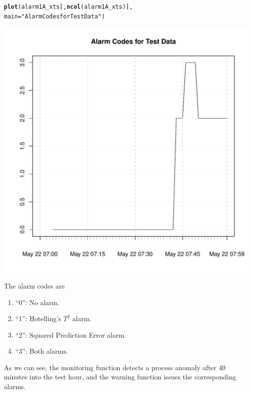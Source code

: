 \documentclass{report}\usepackage[]{graphicx}\usepackage[]{color}
\makeatletter
\def\maxwidth{ %
  \ifdim\Gin@nat@width>\linewidth
    \linewidth
  \else
    \Gin@nat@width
  \fi
}
\newcommand{\hlstr}[1]{\textcolor[rgb]{0.192,0.494,0.8}{#1}}%
\newcommand{\hlstd}[1]{\textcolor[rgb]{0.345,0.345,0.345}{#1}}%
\newcommand{\hlkwc}[1]{\textcolor[rgb]{0.333,0.667,0.333}{#1}}%
\newcommand{\hlkwd}[1]{\textcolor[rgb]{0.737,0.353,0.396}{\textbf{#1}}}%
\newenvironment{kframe}{%
 \def\at@end@of@kframe{}%
 \ifinner\ifhmode%
  \def\at@end@of@kframe{\end{minipage}}%
  \begin{minipage}{\columnwidth}%
 \fi\fi%
 \def\FrameCommand##1{\hskip\@totalleftmargin \hskip-\fboxsep
 \colorbox{shadecolor}{##1}\hskip-\fboxsep
     \hskip-\linewidth \hskip-\@totalleftmargin \hskip\columnwidth}%
 \MakeFramed {\advance\hsize-\width
   \@totalleftmargin\z@ \linewidth\hsize
   \@setminipage}}%
 {\par\unskip\endMakeFramed%
 \at@end@of@kframe}
\newenvironment{knitrout}{}{} %
\makeatother
\begin{document}
\begin{knitrout}
\color{fgcolor}\begin{kframe}
\begin{alltt}
\hlkwd{plot}\hlstd{(alarm1A_xts[,} \hlkwd{ncol}\hlstd{(alarm1A_xts)],}
     \hlkwc{main} \hlstd{=} \hlstr{"Alarm Codes for Test Data"}\hlstd{)}
\end{alltt}
\end{kframe}
\includegraphics[width=\maxwidth]{figure/r_warning_Plot-1} 

\end{knitrout}
The alarm codes are
\begin{enumerate}
\item ``0'': No alarm.
\item ``1'': Hotelling's $T^2$ alarm.
\item ``2'': Squared Prediction Error alarm.
\item ``3'': Both alarms.
\end{enumerate}
As we can see, the monitoring function detects a process anomaly after 40 minutes into the test hour, and the warning function issues the corresponding alarms.
\end{document}
